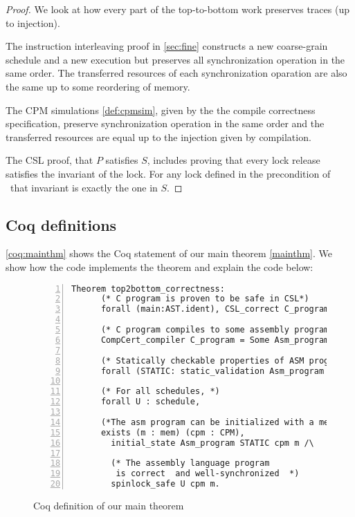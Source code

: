 \begin{proof}
We look at how every part of the top-to-bottom work preserves traces (up to injection). 

The instruction interleaving proof in \cref{sec:fine} constructs a new coarse-grain schedule and a new execution but  preserves all synchronization operation in the same order. The transferred resources of each synchronization oparation are also the same up to some reordering of memory. 

The CPM simulations \cref{def:cpmsim}, given by the the compile correctness specification, preserve synchronization operation in the same order and the transferred resources are equal up to the injection given by compilation.

The CSL proof, that $P$ satisfies $S$, includes proving that every lock release satisfies the invariant of the lock. For any lock defined in the precondition of \main\ that invariant is exactly the one in $S$.
\end{proof}

\subsection{Coq definitions}\label{sec:coqmainthm}


 

\autoref{coq:mainthm} shows the Coq statement of our main theorem 
\hyperlink{mainthm-formal}{\ref*{mainthm}}. We show how the code implements the theorem and explain the code below:



\begin{figure}
\begin{lstlisting}[numbers=left]
  Theorem top2bottom_correctness:
      (* C program is proven to be safe in CSL*)
      forall (main:AST.ident), CSL_correct C_program main  ->

      (* C program compiles to some assembly program*)
      CompCert_compiler C_program = Some Asm_program ->
        
      (* Statically checkable properties of ASM program *)
      forall (STATIC: static_validation Asm_program main),

      (* For all schedules, *)
      forall U : schedule,
        
      (*The asm program can be initialized with a memory and CPM state*)
      exists (m : mem) (cpm : CPM),
        initial_state Asm_program STATIC cpm m /\
        
        (* The assembly language program 
         is correct  and well-synchronized  *)
        spinlock_safe U cpm m.
\end{lstlisting}
\caption{Coq definition of our main theorem}\label{coq:mainthm}
\end{figure}

